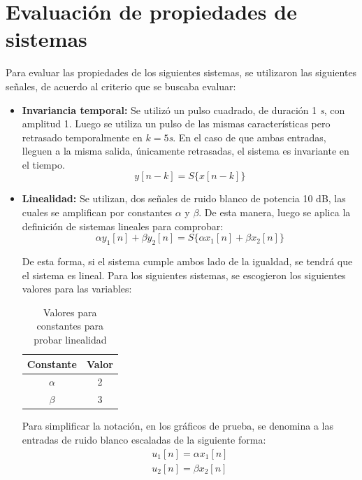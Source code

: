 \section{Evaluación de propiedades de sistemas}
	Para evaluar las propiedades de los siguientes sistemas, se utilizaron las siguientes señales, de acuerdo al criterio que se buscaba evaluar:
	\begin{itemize}
		\item \textbf{Invariancia temporal:} Se utilizó un pulso cuadrado, de duración 1 \textit{s}, con amplitud 1. Luego se utiliza un pulso de las mismas características pero retrasado temporalmente en $k = 5$\textit{s}. En el caso de que ambas entradas, lleguen a la misma salida, únicamente retrasadas, el sistema es invariante en el tiempo.
		\begin{equation}
			y[n-k] = S\{ x[n-k]  \}
			\label{eq:cond_invarianza_temporal}
		\end{equation}
		
		\item \textbf{Linealidad:} Se utilizan, dos señales de ruido blanco de potencia 10 dB, las cuales se amplifican por constantes $\alpha$ y $\beta$. De esta manera, luego se aplica la definición de sistemas lineales para comprobar:
		\begin{equation}
			\alpha y_{1}[n] + \beta y_{2}[n] = S \{ \alpha x_{1}[n] + \beta x_{2}[n] \} 
			\label{eq:cond_linealidad}
		\end{equation}
		
		De esta forma, si el sistema cumple ambos lado de la igualdad, se tendrá que el sistema es lineal. Para los siguientes sistemas, se escogieron los siguientes valores para las variables:
		\begin{table}[H]
			\center
			\begin{tabular}{|c|c|}
				\hline
				\textbf{Constante} & \textbf{Valor} \\
				\hline
				$\alpha$ & 2 \\
				\hline
				$\beta$ & 3 \\
				\hline			
			\end{tabular}
			\caption{Valores para constantes para probar linealidad}
			\label{tab:lineal_const_values} 	
		\end{table}
		
		Para simplificar la notación, en los gráficos de prueba, se denomina a las entradas de ruido blanco escaladas de la siguiente forma:
		\begin{align}
			u_{1}[n] = \alpha x_{1}[n] \\
			u_{2}[n] = \beta x_{2}[n]
			\label{eq:lineality_inputs}
		\end{align}
		

\end{itemize}
